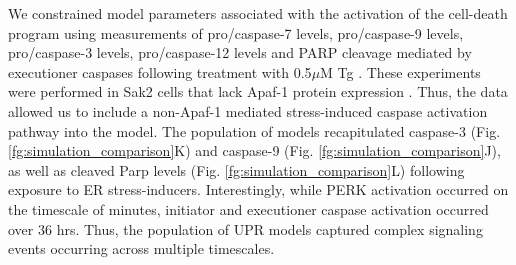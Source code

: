 \documentclass[fleqn,10pt]{wlscirep}
\begin{document}
We constrained model parameters associated with the activation of the cell-death program using measurements of pro/caspase-7 levels, pro/caspase-9 levels, pro/caspase-3 levels, pro/caspase-12 levels and PARP cleavage mediated by executioner caspases following treatment with 0.5$\mu$M Tg \cite{rao2002cer}.
These experiments were performed in Sak2 cells that lack Apaf-1 protein expression \cite{rao2002cer}.
Thus, the data allowed us to include a non-Apaf-1 mediated stress-induced caspase activation pathway into the model.
The population of models recapitulated caspase-3 (Fig. \ref{fg:simulation_comparison}K) and caspase-9 (Fig. \ref{fg:simulation_comparison}J), as well as cleaved Parp levels (Fig. \ref{fg:simulation_comparison}L) following exposure to ER stress-inducers.
Interestingly, while PERK activation occurred on the timescale of minutes, initiator and executioner caspase activation occurred over 36 hrs.
Thus, the population of UPR models captured complex signaling events occurring across multiple timescales.
\end{document}
